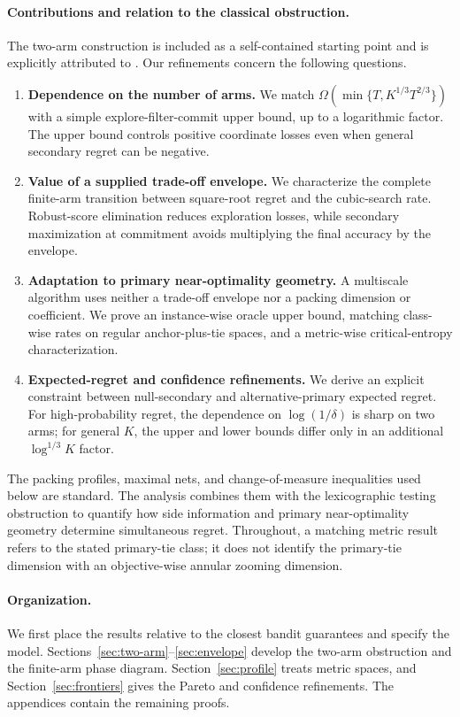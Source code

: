 \documentclass[11pt]{article}
\theoremstyle{definition}
\begin{document}
\paragraph{Contributions and relation to the classical obstruction.}
The two-arm construction is included as a self-contained starting point
and is explicitly attributed to \citet{huyuk2021lexicographic}. Our
refinements concern the following questions.
\begin{enumerate}[leftmargin=2.1em]
  \item \textbf{Dependence on the number of arms.}
  We match $\Omega(\min\{T,K^{1/3}T^{2/3}\})$ with a simple
  explore-filter-commit upper bound, up to a logarithmic factor.
  The upper bound controls positive coordinate losses even when general
  secondary regret can be negative.
  \item \textbf{Value of a supplied trade-off envelope.}
  We characterize the complete finite-arm transition between square-root
  regret and the cubic-search rate. Robust-score elimination reduces
  exploration losses, while secondary maximization at commitment avoids
  multiplying the final accuracy by the envelope.
  \item \textbf{Adaptation to primary near-optimality geometry.}
  A multiscale algorithm uses neither a trade-off envelope nor a packing
  dimension or coefficient. We prove an instance-wise oracle upper bound,
  matching class-wise rates on regular anchor-plus-tie spaces, and a
  metric-wise critical-entropy characterization.
  \item \textbf{Expected-regret and confidence refinements.}
  We derive an explicit constraint between null-secondary and
  alternative-primary expected regret. For high-probability regret,
  the dependence on $\log(1/\delta)$ is sharp on two arms; for general
  $K$, the upper and lower bounds differ only in an additional
  $\log^{1/3}K$ factor.
\end{enumerate}

The packing profiles, maximal nets, and change-of-measure inequalities
used below are standard. The analysis combines them with the
lexicographic testing obstruction to quantify how side information and
primary near-optimality geometry determine simultaneous regret.
Throughout, a matching metric result refers to the stated primary-tie
class; it does not identify the primary-tie dimension with an
objective-wise annular zooming dimension.

\paragraph{Organization.}
We first place the results relative to the closest bandit guarantees and
specify the model. Sections~\ref{sec:two-arm}--\ref{sec:envelope} develop
the two-arm obstruction and the finite-arm phase diagram.
Section~\ref{sec:profile} treats metric spaces, and
Section~\ref{sec:frontiers} gives the Pareto and confidence refinements.
The appendices contain the remaining proofs.
\end{document}
